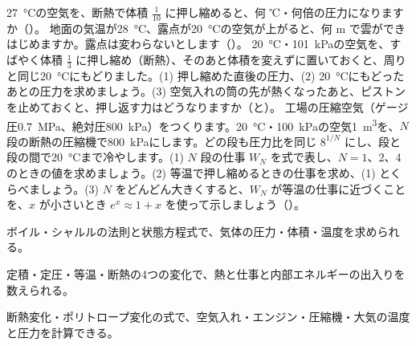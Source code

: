 \bkproblem \qty{27}{\celsius}の空気を、断熱で体積 $\tfrac{1}{10}$ に押し縮めると、何 ℃・何倍の圧力になりますか（）。
\bkproblem 地面の気温が\qty{28}{\celsius}、露点が\qty{20}{\celsius}の空気が上がると、何 m で雲ができはじめますか。露点は変わらないとします（）。
\bkproblem \qty{20}{\celsius}・\qty{101}{kPa}の空気を、すばやく体積 $\tfrac{1}{3}$ に押し縮め（断熱）、そのあと体積を変えずに置いておくと、周りと同じ\qty{20}{\celsius}にもどりました。(1) 押し縮めた直後の圧力、(2) \qty{20}{\celsius}にもどったあとの圧力を求めましょう。(3) 空気入れの筒の先が熱くなったあと、ピストンを止めておくと、押し返す力はどうなりますか（と）。
\bkproblem 工場の圧縮空気（ゲージ圧\qty{0.7}{MPa}、絶対圧\qty{800}{kPa}）をつくります。\qty{20}{\celsius}・\qty{100}{kPa}の空気\qty{1}{m^3}を、$N$ 段の断熱の圧縮機で\qty{800}{kPa}にします。どの段も圧力比を同じ $8^{1/N}$ にし、段と段の間で\qty{20}{\celsius}まで冷やします。(1) $N$ 段の仕事 $W_N$ を式で表し、$N=1$、2、4 のときの値を求めましょう。(2) 等温で押し縮めるときの仕事を求め、(1) とくらべましょう。(3) $N$ をどんどん大きくすると、$W_N$ が等温の仕事に近づくことを、$x$ が小さいとき $e^x\approx1+x$ を使って示しましょう（）。

\begin{furikaeri}
\begin{checklist}
\item ボイル・シャルルの法則と状態方程式で、気体の圧力・体積・温度を求められる。
\item 定積・定圧・等温・断熱の4つの変化で、熱と仕事と内部エネルギーの出入りを数えられる。
\item 断熱変化・ポリトロープ変化の式で、空気入れ・エンジン・圧縮機・大気の温度と圧力を計算できる。
\end{checklist}
\end{furikaeri}
